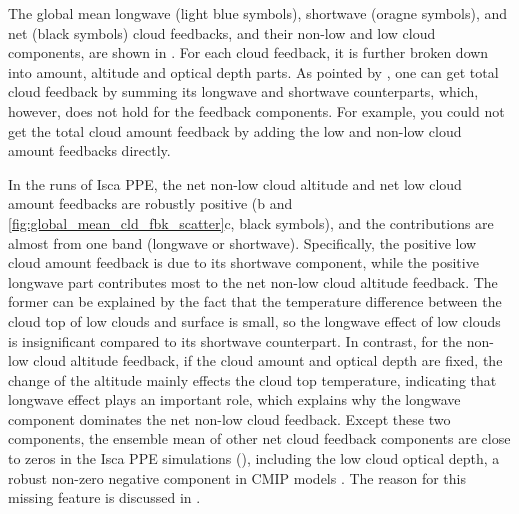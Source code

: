 The global mean longwave (light blue symbols), shortwave (oragne symbols), and net (black symbols) cloud feedbacks, and their non-low and low cloud components, are shown in . For each cloud feedback, it is further broken down into amount, altitude and optical depth parts. As pointed by \cite{Zelinka2012computing2}, one can get total cloud feedback by summing its longwave and shortwave counterparts, which, however, does not hold for the feedback components. For example, you could not get the total cloud amount feedback by adding the low and non-low cloud amount feedbacks directly.

In the runs of Isca PPE, the net non-low cloud altitude and net low cloud amount feedbacks are robustly positive (b and \ref{fig:global_mean_cld_fbk_scatter}c, black symbols), and the contributions are almost from one band (longwave or shortwave). Specifically, the positive low cloud amount feedback is due to its shortwave component, while the positive longwave part contributes most to the net non-low cloud altitude feedback. The former can be explained by the fact that the temperature difference between the cloud top of low clouds and surface is small, so the longwave effect of low clouds is insignificant compared to its shortwave counterpart. In contrast, for the non-low cloud altitude feedback, if the cloud amount and optical depth are fixed, the change of the altitude mainly effects the cloud top temperature, indicating that longwave effect plays an important role, which explains why the longwave component dominates the net non-low cloud feedback. Except these two components, the ensemble mean of other net cloud feedback components are close to zeros in the Isca PPE simulations (), including the low cloud optical depth, a robust non-zero negative component in CMIP models \citep[e.g.,][]{Zelinka2016insights,Ceppi2017,Zelinka2020causes}. The reason for this missing feature is discussed in .


